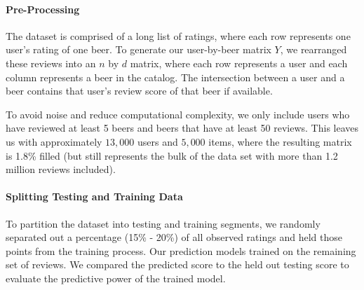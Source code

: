\documentclass[12pt]{article}
\begin{document}

\paragraph{Pre-Processing}
The dataset is comprised of a long list of ratings, where each row represents one user's rating of one beer. To generate our user-by-beer matrix $Y$, we rearranged these reviews into an $n$ by $d$ matrix, where each row represents a user and each column represents a beer in the catalog. The intersection between a user and a beer contains that user's review score of that beer if available.

To avoid noise and reduce computational complexity, we only include users who have reviewed at least 5 beers and beers that have at least 50 reviews. This leaves us with approximately $13,000$ users and $5,000$ items, where the resulting matrix is 1.8\% filled (but still represents the bulk of the data set with more than 1.2 million reviews included).





\paragraph{Splitting Testing and Training Data} To partition the dataset into testing and training segments, we randomly separated out a percentage (15\% - 20\%) of all observed ratings and held those points from the training process. Our prediction models trained on the remaining set of reviews. We compared the predicted score to the held out testing score to evaluate the predictive power of the trained model.
\end{document}
